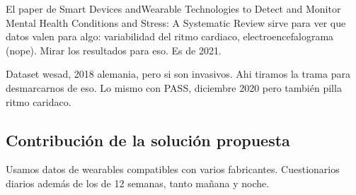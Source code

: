 El paper de Smart Devices andWearable Technologies to Detect and
Monitor Mental Health Conditions and Stress:
A Systematic Review sirve para ver que datos valen para algo: variabilidad del ritmo cardiaco,  electroencefalograma (nope). Mirar los resultados para eso. Es de 2021.

Dataset wesad, 2018 alemania, pero si son invasivos. Ahi tiramos la trama para desmarcarnos de eso. Lo mismo con PASS, diciembre 2020 pero también pilla ritmo caridaco.

\subsection{Contribución de la solución propuesta}

Usamos datos de wearables compatibles con varios fabricantes.
Cuestionarios diarios además de los de 12 semanas, tanto mañana y noche.